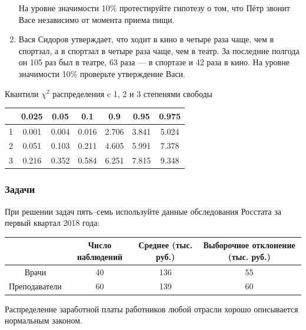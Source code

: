 \begin{enumerate}
	На уровне значимости 10\% протестируйте гипотезу о том, что Пётр звонит Васе независимо от момента приема пищи.


\item Вася Сидоров утверждает, что ходит в кино в четыре раза чаще, чем в спортзал, а в спортзал в четыре раза чаще, чем в театр.
За последние полгода он 105 раз был в театре, 63 раза — в спортазе и 42 раза в кино.
На уровне значимости 10\% проверьте утверждение Васи.

\end{enumerate}


	\begin{center}
	Квантили $\chi^2$ распределения c 1, 2 и 3 степенями свободы\\
		\begin{tabular}{c|cccccc}
			\toprule
			& 0.025 & 0.05 & 0.1 & 0.9 & 0.95 & 0.975\\
			\midrule
							1 & 0.001 & 0.004 & 0.016 & 2.706 & 3.841 & 5.024 \\
							2 & 0.051 & 0.103 & 0.211 & 4.605 & 5.991 & 7.378 \\
							3 & 0.216 & 0.352 & 0.584 & 6.251 & 7.815 & 9.348 \\
			\bottomrule
		\end{tabular}
	\end{center}

\newpage

\subsubsection*{Задачи}

При решении задач пять–семь используйте данные обследования Росстата за первый квартал 2018 года:

	\begin{center}
		\begin{tabular}{c|ccc}
			\toprule
			& Число наблюдений & Среднее (тыс. руб.) & Выборочное отклонение (тыс. руб.) \\
			\midrule
							Врачи & 40 & 136 & 55  \\
							Преподаватели & 60 & 139 & 60 \\
			\bottomrule
		\end{tabular}
	\end{center}

Распределение заработной платы работников любой отрасли хорошо описывается нормальным законом.

